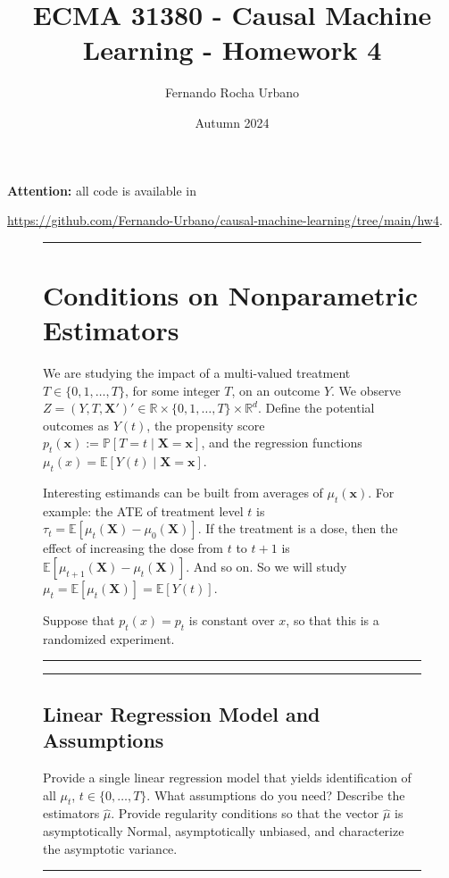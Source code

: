 \documentclass{article}
\title{ECMA 31380 - Causal Machine Learning - Homework 4}
\author{Fernando Rocha Urbano}
\date{Autumn 2024}
\newenvironment{colorparagraph}[1]{\par\color{#1}}{\par}
\begin{document}
\maketitle

\textbf{Attention:} all code is available in

\url{https://github.com/Fernando-Urbano/causal-machine-learning/tree/main/hw4}.

\begin{figure}[H]
  \begin{colorparagraph}{questioncolor}
  \rule{\textwidth}{0.5pt}
  \label{q1}
  \section{Conditions on Nonparametric Estimators}
  
  We are studying the impact of a multi-valued treatment \( T \in \{0, 1, \dots, T\} \), for some integer \( T \), on an outcome \( Y \). We observe \( Z = (Y, T, \mathbf{X}')' \in \mathbb{R} \times \{0, 1, \dots, T\} \times \mathbb{R}^d \). Define the potential outcomes as \( Y(t) \), the propensity score \( p_t(\mathbf{x}) := \mathbb{P}[T = t \mid \mathbf{X} = \mathbf{x}] \), and the regression functions \( \mu_t(x) = \mathbb{E}[Y(t) \mid \mathbf{X} = \mathbf{x}] \).
  
  Interesting estimands can be built from averages of \( \mu_t(\mathbf{x}) \). For example: the ATE of treatment level \( t \) is \( \tau_t = \mathbb{E}[\mu_t(\mathbf{X}) - \mu_0(\mathbf{X})] \). If the treatment is a dose, then the effect of increasing the dose from \( t \) to \( t+1 \) is \( \mathbb{E}[\mu_{t+1}(\mathbf{X}) - \mu_t(\mathbf{X})] \). And so on. So we will study \( \mu_t = \mathbb{E}[\mu_t(\mathbf{X})] = \mathbb{E}[Y(t)] \).
  
  Suppose that \( p_t(x) = p_t \) is constant over \( x \), so that this is a randomized experiment.
  
  \rule{\textwidth}{0.5pt}
  \end{colorparagraph}
\end{figure}
  
\begin{figure}[H]
  \begin{colorparagraph}{questioncolor}
  \rule{\textwidth}{0.5pt}
  \label{q1a}
  \subsection{Linear Regression Model and Assumptions}
  
  Provide a single linear regression model that yields identification of all \( \mu_t \), \( t \in \{0, \dots, T\} \). What assumptions do you need? Describe the estimators \( \hat{\mu} \). Provide regularity conditions so that the vector \( \hat{\mu} \) is asymptotically Normal, asymptotically unbiased, and characterize the asymptotic variance.
  
  \rule{\textwidth}{0.5pt}
  \end{colorparagraph}
\end{figure}
\end{document}
